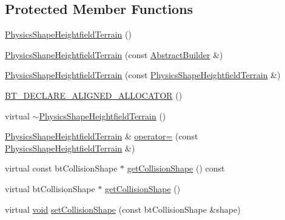 \subsection*{Protected Member Functions}
\begin{DoxyCompactItemize}
\item 
\mbox{\hyperlink{classnjli_1_1_physics_shape_heightfield_terrain_a86dc8ee8ab41a62c6520cc7a33064fc1}{Physics\+Shape\+Heightfield\+Terrain}} ()
\item 
\mbox{\hyperlink{classnjli_1_1_physics_shape_heightfield_terrain_a0f108ebf1e1d7344189da6f5ac1853c7}{Physics\+Shape\+Heightfield\+Terrain}} (const \mbox{\hyperlink{classnjli_1_1_abstract_builder}{Abstract\+Builder}} \&)
\item 
\mbox{\hyperlink{classnjli_1_1_physics_shape_heightfield_terrain_a1f04a12e54baaab4644b1eb1a7a03c93}{Physics\+Shape\+Heightfield\+Terrain}} (const \mbox{\hyperlink{classnjli_1_1_physics_shape_heightfield_terrain}{Physics\+Shape\+Heightfield\+Terrain}} \&)
\item 
\mbox{\hyperlink{classnjli_1_1_physics_shape_heightfield_terrain_a406a8216e9feed043e83c3414672c741}{B\+T\+\_\+\+D\+E\+C\+L\+A\+R\+E\+\_\+\+A\+L\+I\+G\+N\+E\+D\+\_\+\+A\+L\+L\+O\+C\+A\+T\+OR}} ()
\item 
virtual \mbox{\hyperlink{classnjli_1_1_physics_shape_heightfield_terrain_a0351b0629c7a9b21bbd36639935dfaed}{$\sim$\+Physics\+Shape\+Heightfield\+Terrain}} ()
\item 
\mbox{\hyperlink{classnjli_1_1_physics_shape_heightfield_terrain}{Physics\+Shape\+Heightfield\+Terrain}} \& \mbox{\hyperlink{classnjli_1_1_physics_shape_heightfield_terrain_a9f6223a214fcf82096b00651e7ae2abe}{operator=}} (const \mbox{\hyperlink{classnjli_1_1_physics_shape_heightfield_terrain}{Physics\+Shape\+Heightfield\+Terrain}} \&)
\item 
virtual const bt\+Collision\+Shape $\ast$ \mbox{\hyperlink{classnjli_1_1_physics_shape_heightfield_terrain_a2de5e5e8c2d159963c46664d7ec4ab10}{get\+Collision\+Shape}} () const
\item 
virtual bt\+Collision\+Shape $\ast$ \mbox{\hyperlink{classnjli_1_1_physics_shape_heightfield_terrain_a43635ec439d573213bae218901050d66}{get\+Collision\+Shape}} ()
\item 
virtual \mbox{\hyperlink{_thread_8h_af1e856da2e658414cb2456cb6f7ebc66}{void}} \mbox{\hyperlink{classnjli_1_1_physics_shape_heightfield_terrain_aba0df18d6c428c60f6efe61bb0fe1699}{set\+Collision\+Shape}} (const bt\+Collision\+Shape \&shape)
\end{DoxyCompactItemize}
